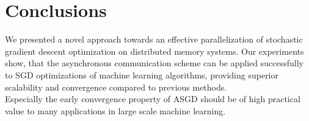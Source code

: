 \documentclass{acm_proc_article-sp}
\begin{document}
\section{Conclusions}
We presented a novel approach towards an effective parallelization of 
stochastic gradient descent optimization on distributed memory systems.
Our experiments show, that the asynchronous communication scheme can 
be applied successfully to SGD optimizations of machine learning algorithms, 
providing superior scalability and convergence compared 
to previous methods.\\
Especially the early convergence property of ASGD should be of high practical
value to many applications in large scale machine learning.  

  
\balancecolumns
\end{document}

